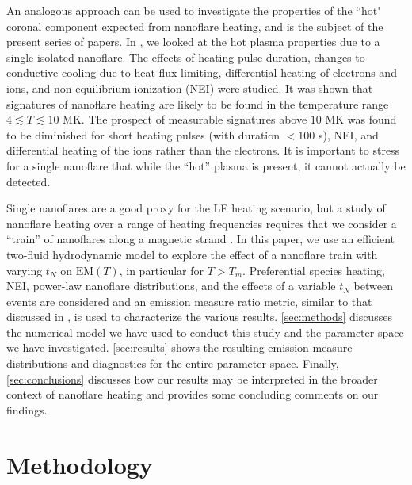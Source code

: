 \documentclass[preprint]{aastex}
\begin{document}
	\par An analogous approach can be used to investigate the properties of the ``hot" coronal component expected from nanoflare heating, and is the subject of the present series of papers. In \citet{barnes_inference_2016} , we looked at the hot plasma properties due to a single isolated nanoflare. The effects of heating pulse duration, changes to conductive cooling due to heat flux limiting, differential heating of electrons and ions, and non-equilibrium ionization (NEI) were studied. It was shown that signatures of nanoflare heating are likely to be found in the temperature range $4\lesssim T\lesssim 10$ MK. The prospect of measurable signatures above $10$ MK was found to be diminished for short heating pulses (with duration $<100$ s), NEI, and differential heating of the ions rather than the electrons. It is important to stress for a single nanoflare that while the ``hot'' plasma is present, it cannot actually be detected.
	\par Single nanoflares are a good proxy for the LF heating scenario, but a study of nanoflare heating over a range of heating frequencies requires that we consider a ``train'' of nanoflares along a magnetic strand \citep{viall_patterns_2011,warren_constraints_2011,reep_diagnosing_2013,cargill_modelling_2015}. In this paper, we use an efficient two-fluid hydrodynamic model to explore the effect of a nanoflare train with varying $t_N$ on $\mathrm{EM}(T)$, in particular for $T>T_m$. Preferential species heating, NEI, power-law nanoflare distributions, and the effects of a variable $t_N$ between events are considered and an emission measure ratio metric, similar to that discussed in \citet{brosius_pervasive_2014}, is used to characterize the various results. \autoref{sec:methods} discusses the numerical model we have used to conduct this study and the parameter space we have investigated. \autoref{sec:results} shows the resulting emission measure distributions and diagnostics for the entire parameter space. Finally, \autoref{sec:conclusions} discusses how our results may be interpreted in the broader context of nanoflare heating and provides some concluding comments on our findings.
	\section{Methodology}
	\label{sec:methods}
\end{document}
